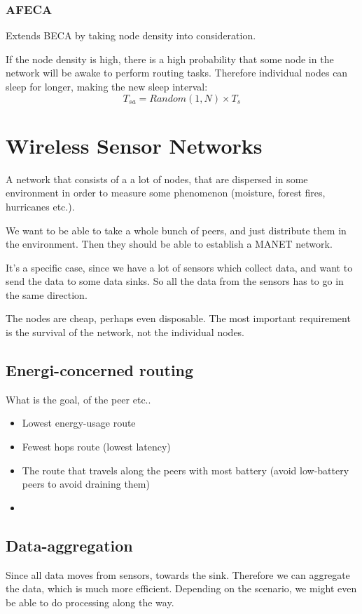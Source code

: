 	\subsubsection{AFECA}
	Extends BECA by taking node density into consideration.
	
	If the node density is high, there is a high probability that some node in the network will be awake to perform routing tasks. Therefore individual nodes can sleep for longer, making the new sleep interval:
	$$ T_{sa} = Random(1, N) \times T_s $$	
	
	\section{Wireless Sensor Networks}
	A network that consists of a a lot of nodes, that are dispersed in some environment in order to measure some phenomenon (moisture, forest fires, hurricanes etc.).
	
	We want to be able to take a whole bunch of peers, and just distribute them in the environment. Then they should be able to establish a MANET network.
	
	It's a specific case, since we have a lot of sensors which collect data, and want to send the data to some data sinks. So all the data from the sensors has to go in the same direction.
	
	The nodes are cheap, perhaps even disposable. The most important requirement is the survival of the network, not the individual nodes.
	
	\subsection{Energi-concerned routing}
	What is the goal, of the peer etc..
	\begin{itemize}
		\item Lowest energy-usage route
		\item Fewest hops route (lowest latency)
		\item The route that travels along the peers with most battery (avoid low-battery peers to avoid draining them)
		\item
	\end{itemize}
	
	\subsection{Data-aggregation}
	Since all data moves from sensors, towards the sink. Therefore we can aggregate the data, which is much more efficient. Depending on the scenario, we might even be able to do processing along the way.
	
